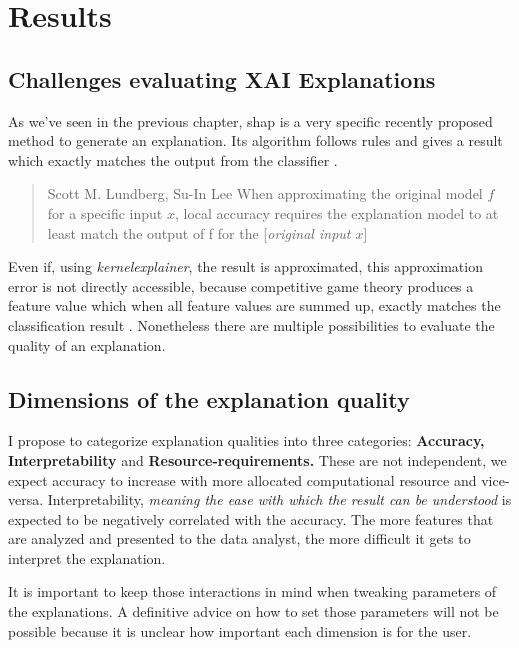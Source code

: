\chapter{Results}
\label{ch:Results}

\section{Challenges evaluating XAI Explanations}

As we've seen in the previous chapter, shap is a very specific recently proposed method to generate an explanation. Its algorithm follows rules and gives a result which exactly matches the output from the classifier \cite{NIPS2017_7062}.

\begin{quote}{Scott M. Lundberg, Su-In Lee \cite{shapPaper}}
    When approximating the original model $f$ for a specific input $x$, local accuracy requires the explanation model to at least match the output of f for the [\textit{original input $x$}]
\end{quote}

Even if, using \textit{kernelexplainer}, the result is approximated, this approximation error is not directly accessible, because competitive game theory produces a feature value which when all feature values are summed up, exactly matches the classification result \cite{shapPaper, compGameTheory}. Nonetheless there are multiple possibilities to evaluate the quality of an explanation.

\section{Dimensions of the explanation quality}

I propose to categorize explanation qualities into three categories: \textbf{Accuracy, Interpretability} and \textbf{Resource-requirements.} These are not independent, we expect accuracy to increase with more allocated computational resource and vice-versa. Interpretability, \textit{meaning the ease with which the result can be understood} is expected to be negatively correlated with the accuracy. The more features that are analyzed and presented to the data analyst, the more difficult it gets to interpret the explanation.

It is important to keep those interactions in mind when tweaking parameters of the explanations. A definitive advice on how to set those parameters will not be possible because it is unclear how important each dimension is for the user.

